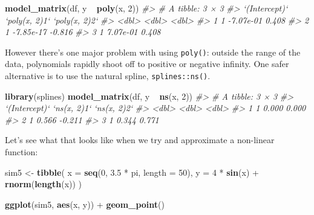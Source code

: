 \documentclass[]{book}
\newenvironment{Shaded}{\begin{snugshade}}{\end{snugshade}}
\newcommand{\KeywordTok}[1]{\textcolor[rgb]{0.13,0.29,0.53}{\textbf{{#1}}}}
\newcommand{\DataTypeTok}[1]{\textcolor[rgb]{0.13,0.29,0.53}{{#1}}}
\newcommand{\DecValTok}[1]{\textcolor[rgb]{0.00,0.00,0.81}{{#1}}}
\newcommand{\FloatTok}[1]{\textcolor[rgb]{0.00,0.00,0.81}{{#1}}}
\newcommand{\StringTok}[1]{\textcolor[rgb]{0.31,0.60,0.02}{{#1}}}
\newcommand{\CommentTok}[1]{\textcolor[rgb]{0.56,0.35,0.01}{\textit{{#1}}}}
\newcommand{\NormalTok}[1]{{#1}}
\begin{document}
\begin{Shaded}
\begin{Highlighting}[]
\KeywordTok{model_matrix}\NormalTok{(df, y ~}\StringTok{ }\KeywordTok{poly}\NormalTok{(x, }\DecValTok{2}\NormalTok{))}
\CommentTok{#> # A tibble: 3 × 3}
\CommentTok{#>   `(Intercept)` `poly(x, 2)1` `poly(x, 2)2`}
\CommentTok{#>           <dbl>         <dbl>         <dbl>}
\CommentTok{#> 1             1     -7.07e-01         0.408}
\CommentTok{#> 2             1     -7.85e-17        -0.816}
\CommentTok{#> 3             1      7.07e-01         0.408}
\end{Highlighting}
\end{Shaded}

However there's one major problem with using \texttt{poly()}: outside
the range of the data, polynomials rapidly shoot off to positive or
negative infinity. One safer alternative is to use the natural spline,
\texttt{splines::ns()}.

\begin{Shaded}
\begin{Highlighting}[]
\KeywordTok{library}\NormalTok{(splines)}
\KeywordTok{model_matrix}\NormalTok{(df, y ~}\StringTok{ }\KeywordTok{ns}\NormalTok{(x, }\DecValTok{2}\NormalTok{))}
\CommentTok{#> # A tibble: 3 × 3}
\CommentTok{#>   `(Intercept)` `ns(x, 2)1` `ns(x, 2)2`}
\CommentTok{#>           <dbl>       <dbl>       <dbl>}
\CommentTok{#> 1             1       0.000       0.000}
\CommentTok{#> 2             1       0.566      -0.211}
\CommentTok{#> 3             1       0.344       0.771}
\end{Highlighting}
\end{Shaded}

Let's see what that looks like when we try and approximate a non-linear
function:

\begin{Shaded}
\begin{Highlighting}[]
\NormalTok{sim5 <-}\StringTok{ }\KeywordTok{tibble}\NormalTok{(}
  \DataTypeTok{x =} \KeywordTok{seq}\NormalTok{(}\DecValTok{0}\NormalTok{, }\FloatTok{3.5} \NormalTok{*}\StringTok{ }\NormalTok{pi, }\DataTypeTok{length =} \DecValTok{50}\NormalTok{),}
  \DataTypeTok{y =} \DecValTok{4} \NormalTok{*}\StringTok{ }\KeywordTok{sin}\NormalTok{(x) +}\StringTok{ }\KeywordTok{rnorm}\NormalTok{(}\KeywordTok{length}\NormalTok{(x))}
\NormalTok{)}

\KeywordTok{ggplot}\NormalTok{(sim5, }\KeywordTok{aes}\NormalTok{(x, y)) +}
\StringTok{  }\KeywordTok{geom_point}\NormalTok{()}
\end{Highlighting}
\end{Shaded}
\end{document}
